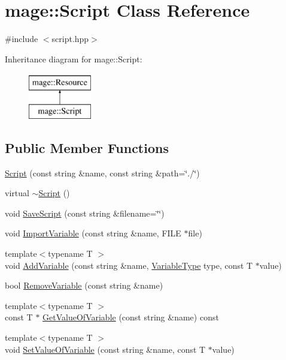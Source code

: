 \hypertarget{classmage_1_1_script}{}\section{mage\+:\+:Script Class Reference}
\label{classmage_1_1_script}


{\ttfamily \#include $<$script.\+hpp$>$}

Inheritance diagram for mage\+:\+:Script\+:\begin{figure}[H]
\begin{center}
\leavevmode
\includegraphics[height=2.000000cm]{classmage_1_1_script}
\end{center}
\end{figure}
\subsection*{Public Member Functions}
\begin{DoxyCompactItemize}
\item 
\hyperlink{classmage_1_1_script_aa82d3299c964e29ad23b41de3e26c511}{Script} (const string \&name, const string \&path=\char`\"{}./\char`\"{})
\item 
virtual \hyperlink{classmage_1_1_script_a5ac07d9382cc28d5441e4fe6a9ca32e4}{$\sim$\+Script} ()
\item 
void \hyperlink{classmage_1_1_script_a4b6ff9e33d49d58c0d6bfaa189542a64}{Save\+Script} (const string \&filename=\char`\"{}\char`\"{})
\item 
void \hyperlink{classmage_1_1_script_a2516f50a7ba6497759a872f333f602d3}{Import\+Variable} (const string \&name, F\+I\+LE $\ast$file)
\item 
{\footnotesize template$<$typename T $>$ }\\void \hyperlink{classmage_1_1_script_adddcf5845bd1e4e9f29fec3427661baf}{Add\+Variable} (const string \&name, \hyperlink{namespacemage_a530428e73bac0ba7fe84b29086a9e33a}{Variable\+Type} type, const T $\ast$value)
\item 
bool \hyperlink{classmage_1_1_script_ae4fb33c1a307e2dc36a2fbe4020652f5}{Remove\+Variable} (const string \&name)
\item 
{\footnotesize template$<$typename T $>$ }\\const T $\ast$ \hyperlink{classmage_1_1_script_ab210262788259c2b8178824731c56222}{Get\+Value\+Of\+Variable} (const string \&name) const
\item 
{\footnotesize template$<$typename T $>$ }\\void \hyperlink{classmage_1_1_script_a33c3bfd185386e12ab45b88862d7ca4e}{Set\+Value\+Of\+Variable} (const string \&name, const T $\ast$value)
\end{DoxyCompactItemize}
